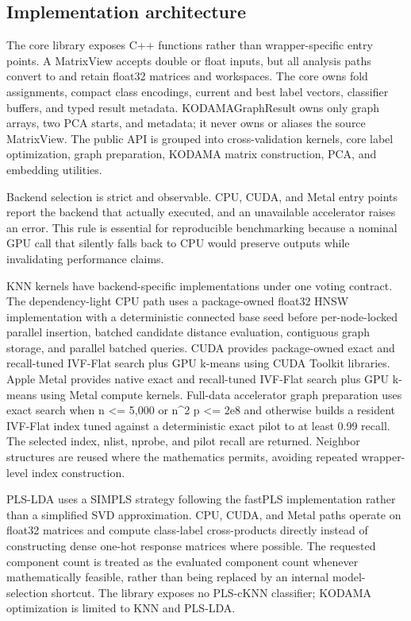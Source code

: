 \documentclass[twoside,11pt]{article}
\begin{document}
\begin{small}
\section{Implementation architecture}
The core library exposes C++ functions rather than wrapper-specific entry points. A MatrixView accepts double or float inputs, but all analysis paths convert to and retain float32 matrices and workspaces. The core owns fold assignments, compact class encodings, current and best label vectors, classifier buffers, and typed result metadata. KODAMAGraphResult owns only graph arrays, two PCA starts, and metadata; it never owns or aliases the source MatrixView. The public API is grouped into cross-validation kernels, core label optimization, graph preparation, KODAMA matrix construction, PCA, and embedding utilities.

Backend selection is strict and observable. CPU, CUDA, and Metal entry points report the backend that actually executed, and an unavailable accelerator raises an error. This rule is essential for reproducible benchmarking because a nominal GPU call that silently falls back to CPU would preserve outputs while invalidating performance claims.

KNN kernels have backend-specific implementations under one voting contract. The dependency-light CPU path uses a package-owned float32 HNSW implementation with a deterministic connected base seed before per-node-locked parallel insertion, batched candidate distance evaluation, contiguous graph storage, and parallel batched queries. CUDA provides package-owned exact and recall-tuned IVF-Flat search plus GPU k-means using CUDA Toolkit libraries. Apple Metal provides native exact and recall-tuned IVF-Flat search plus GPU k-means using Metal compute kernels. Full-data accelerator graph preparation uses exact search when n \textless{}= 5,000 or n\textasciicircum{}2 p \textless{}= 2e8 and otherwise builds a resident IVF-Flat index tuned against a deterministic exact pilot to at least 0.99 recall. The selected index, nlist, nprobe, and pilot recall are returned. Neighbor structures are reused where the mathematics permits, avoiding repeated wrapper-level index construction.

PLS-LDA uses a SIMPLS strategy following the fastPLS implementation rather than a simplified SVD approximation. CPU, CUDA, and Metal paths operate on float32 matrices and compute class-label cross-products directly instead of constructing dense one-hot response matrices where possible. The requested component count is treated as the evaluated component count whenever mathematically feasible, rather than being replaced by an internal model-selection shortcut. The library exposes no PLS-cKNN classifier; KODAMA optimization is limited to KNN and PLS-LDA.


\end{small}
\end{document}
